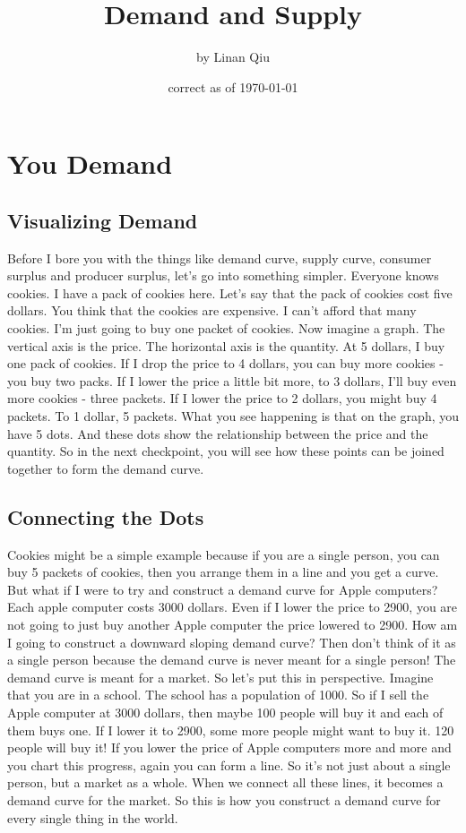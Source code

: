 \RequirePackage{../../dominatrix}

\title{Demand and Supply}
\author{\large by Linan Qiu}
\date{\small correct as of \today}

\maketitle
\tableofcontents

\section{You Demand}
\subsection{Visualizing Demand}
Before I bore you with the things like demand curve, supply curve, consumer surplus and producer surplus, let's go into something simpler. Everyone knows cookies. I have a pack of cookies here. Let's say that the pack of cookies cost five dollars. You think that the cookies are expensive. I can't afford that many cookies. I'm just going to buy one packet of cookies. Now imagine a graph. The vertical axis is the price. The horizontal axis is the quantity. At 5 dollars, I buy one pack of cookies. If I drop the price to 4 dollars, you can buy more cookies - you buy two packs. If I lower the price a little bit more, to 3 dollars, I'll buy even more cookies - three packets. If I lower the price to 2 dollars, you might buy 4 packets. To 1 dollar, 5 packets. What you see happening is that on the graph, you have 5 dots. And these dots show the relationship between the price and the quantity. So in the next checkpoint, you will see how these points can be joined together to form the demand curve.
\subsection{Connecting the Dots}
Cookies might be a simple example because if you are a single person, you can buy 5 packets of cookies, then you arrange them in a line and you get a curve. But what if I were to try and construct a demand curve for Apple computers? Each apple computer costs 3000 dollars. Even if I lower the price to 2900, you are not going to just buy another Apple computer the price lowered to 2900. How am I going to construct a downward sloping demand curve? Then don't think of it as a single person because the demand curve is never meant for a single person! The demand curve is meant for a market. So let's put this in perspective. Imagine that you are in a school. The school has a population of 1000. So if I sell the Apple computer at 3000 dollars, then maybe 100 people will buy it and each of them buys one. If I lower it to 2900, some more people might want to buy it. 120 people will buy it! If you lower the price of Apple computers more and more and you chart this progress, again you can form a line. So it's not just about a single person, but a market as a whole. When we connect all these lines, it becomes a demand curve for the market. So this is how you construct a demand curve for every single thing in the world.
